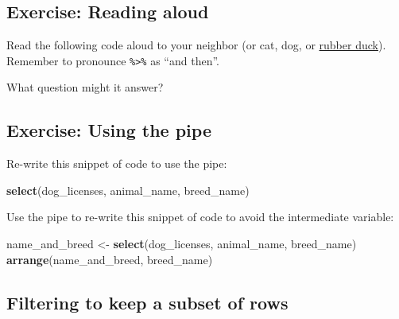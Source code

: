 \documentclass[]{Nemilov}
\newenvironment{Shaded}{\begin{snugshade}}{\end{snugshade}}
\newcommand{\KeywordTok}[1]{\textcolor[rgb]{0.13,0.29,0.53}{\textbf{#1}}}
\newcommand{\NormalTok}[1]{#1}
\newcommand{\OperatorTok}[1]{\textcolor[rgb]{0.81,0.36,0.00}{\textbf{#1}}}
\newcommand{\StringTok}[1]{\textcolor[rgb]{0.31,0.60,0.02}{#1}}
\begin{document}
\hypertarget{exercise-reading-aloud}{%
\subsection{Exercise: Reading aloud}\label{exercise-reading-aloud}}

Read the following code aloud to your neighbor (or cat, dog, or \href{https://en.wikipedia.org/wiki/Rubber_duck_debugging}{rubber duck}). Remember to pronounce \texttt{\%\textgreater{}\%} as ``and then''.

\begin{Shaded}
\end{Shaded}

What question might it answer?

\hypertarget{exercise-using-the-pipe}{%
\subsection{Exercise: Using the pipe}\label{exercise-using-the-pipe}}

Re-write this snippet of code to use the pipe:

\begin{Shaded}
\begin{Highlighting}[]
\KeywordTok{select}\NormalTok{(dog_licenses, animal_name, breed_name)}
\end{Highlighting}
\end{Shaded}

Use the pipe to re-write this snippet of code to avoid the intermediate variable:

\begin{Shaded}
\begin{Highlighting}[]
\NormalTok{name_and_breed <-}\StringTok{ }\KeywordTok{select}\NormalTok{(dog_licenses, animal_name, breed_name)}
\KeywordTok{arrange}\NormalTok{(name_and_breed, breed_name)}
\end{Highlighting}
\end{Shaded}

\hypertarget{filtering-to-keep-a-subset-of-rows}{%
\subsection{Filtering to keep a subset of rows}\label{filtering-to-keep-a-subset-of-rows}}
\end{document}
